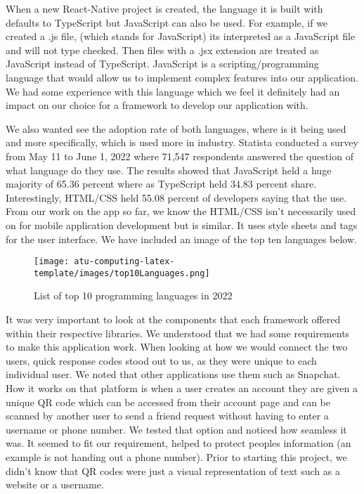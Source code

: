 When a new React-Native project is created, the language it is built with defaults to TypeScript but JavaScript can also be used. For example, if we created a .js file, (which stands for JavaScript) its interpreted as a JavaScript file and will not type checked. Then files with a .jsx extension are treated as JavaScript instead of TypeScript. JavaScript is a scripting/programming language that would allow us to implement complex features into our application. We had some experience with this language which we feel it definitely had an impact on our choice for a framework to develop our application with. 


We also wanted see the adoption rate of both languages, where is it being used and more specifically, which is used more in industry. Statista conducted a survey from May 11 to June 1, 2022 where 71,547 respondents answered the question of what language do they use. The results showed that JavaScript held a huge majority of 65.36\cite{mostused} percent where as TypeScript held 34.83\cite{mostused}  percent share. Interestingly, HTML/CSS held 55.08\cite{mostused}  percent of developers saying that the use. From our work on the app so far, we know the HTML/CSS isn't necessarily used on for mobile application development but is similar. It uses style sheets and tags for the user interface. We have included an image of the top ten languages below. 

\begin{figure}[h]
  \centering
  \texttt{[image: atu-computing-latex-template/images/top10Languages.png]}
  \caption{List of top 10 programming languages in 2022}
  \label{fig:top10languages}
\end{figure}
It was very important to look at the components that each framework offered within their respective libraries. We understood that we had some requirements to make this application work. When looking at how we would connect the two users, quick response\cite{soon2008qr} codes stood out to us, as they were unique to each individual user. We noted that other applications use them such as Snapchat. How it works on that platform is when a user creates an account they are given a unique QR code which can be accessed from their account page and can be scanned by another user to send a friend request without having to enter a username or phone number. We tested that option and noticed how seamless it was. It seemed to fit our requirement, helped to protect peoples information (an example is not handing out a phone number). Prior to starting this project, we didn't know that QR codes were just a visual representation of text such as a website or a username. \cite{soon2008qr}

